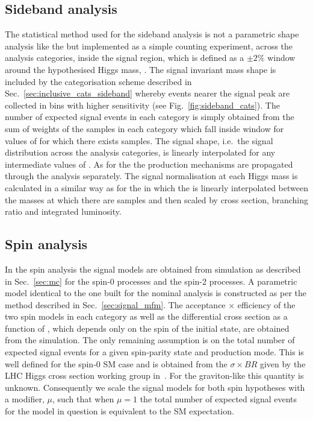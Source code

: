 \subsection{Sideband analysis}
\label{sec:sig_sideband}

The statistical method used for the sideband analysis is not a parametric shape analysis like the \MFM but implemented as a simple counting experiment, across the analysis categories, inside the signal region, which is defined as a $\pm2\%$ window around the hypothesised Higgs mass, \mH. The signal invariant mass shape is included by the categorisation scheme described in Sec.~\ref{sec:inclusive_cats_sideband} whereby events nearer the signal peak are collected in bins with higher sensitivity (see Fig.~\ref{fig:sideband_cats}). The number of expected signal events in each category is simply obtained from the sum of weights of the \MC samples in each category which fall inside window for values of \mH for which there exists \MC samples. The signal shape, i.e.~the signal distribution across the analysis categories, is linearly interpolated for any intermediate values of \mH. As for the \MFM the \SM production mechanisms are propagated through the analysis separately. The signal normalisation at each Higgs mass is calculated in a similar way as for the \MFM in which the \ea is linearly interpolated between the masses at which there are \MC samples and then scaled by cross section, branching ratio and integrated luminosity.

\subsection{Spin analysis}

In the spin analysis the signal models are obtained from \MC simulation as described in Sec.~\ref{sec:mc} for the spin-0 \SM processes and the spin-2 processes. A parametric model identical to the one built for the nominal analysis is constructed as per the method described in Sec.~\ref{sec:signal_mfm}. The acceptance $\times$ efficiency of the two spin models in each category as well as the differential cross section as a function of \abscostheta, which depends only on the spin of the initial state, are obtained from the \MC simulation. The only remaining assumption is on the total number of expected signal events for a given spin-parity state and production mode. This is well defined for the spin-0 SM case and is obtained from the $\sigma\times BR$ given by the LHC Higgs cross section working group in~\cite{LHCHiggsCrossSectionWorkingGroup3}. For the graviton-like \twomp this quantity is unknown. 
Consequently we scale the signal models for both spin hypotheses with a modifier, $\mu$, such that when $\mu=1$ the total number of expected signal events for the model in question is equivalent to the SM expectation. 

